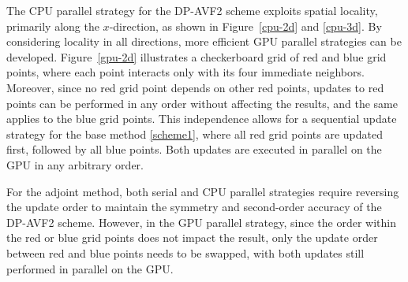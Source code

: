 \documentclass[fleqn,11pt]{elsarticle}
\numberwithin{equation}{section}
\begin{document}
The CPU parallel strategy for the DP-AVF2 scheme exploits spatial locality, primarily along the $x$-direction, as shown in Figure~\ref{cpu-2d} and \ref{cpu-3d}. By considering locality in all directions, more efficient GPU parallel strategies can be developed. Figure~\ref{gpu-2d} illustrates a checkerboard grid of red and blue grid points, where each point interacts only with its four immediate neighbors. Moreover, since no red grid point depends on other red points, updates to red points can be performed in any order without affecting the results, and the same applies to the blue grid points. This independence allows for a sequential update strategy for the base method \eqref{scheme1}, where all red grid points are updated first, followed by all blue points. Both updates are executed in parallel on the GPU in any arbitrary order.

For the adjoint method, both serial and CPU parallel strategies require reversing the update order to maintain the symmetry and second-order accuracy of the DP-AVF2 scheme. However, in the GPU parallel strategy, since the order within the red or blue grid points does not impact the result, only the update order between red and blue points needs to be swapped, with both updates still performed in parallel on the GPU.
\end{document}
